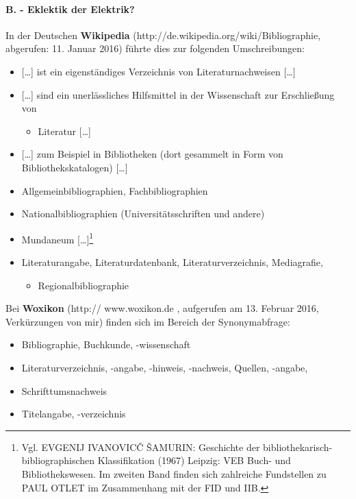 \documentclass[a4paper,
fontsize=11pt,
oneside,
numbers=noperiodatend,
parskip=half-,
bibliography=totoc,
final
]{scrartcl}
\providecommand{\tightlist}{%
  \setlength{\itemsep}{0pt}\setlength{\parskip}{0pt}}
\begin{document}
\paragraph{B. - Eklektik der
Elektrik?}\label{b.---eklektik-der-elektrik}

In der Deutschen \textbf{Wikipedia}
(http://de.wikipedia.org/wiki/Bibliographie, abgerufen: 11. Januar 2016)
führte dies zur folgenden Umschreibungen:

\begin{itemize}
\item
  {[}\ldots{}{]} ist ein eigenständiges Verzeichnis von
  Literaturnachweisen {[}\ldots{}{]}
\item
  {[}\ldots{}{]} sind ein unerlässliches Hilfsmittel in der Wissenschaft
  zur Erschließung von

  \begin{itemize}
  \tightlist
  \item
    Literatur {[}\ldots{}{]}
  \end{itemize}
\item
  {[}\ldots{}{]} zum Beispiel in Bibliotheken (dort gesammelt in Form
  von Bibliothekskatalogen) {[}\ldots{}{]}
\item
  Allgemeinbibliographien, Fachbibliographien
\item
  Nationalbibliographien (Universitätsschriften und andere)
\item
  Mundaneum {[}\ldots{}{]}\footnote{Vgl. EVGENIJ IVANOVICČ ŠAMURIN:
    Geschichte der bibliothekarisch-bibliographischen Klassifikation
    (1967) Leipzig: VEB Buch- und Bibliothekswesen. Im zweiten Band
    finden sich zahlreiche Fundstellen zu PAUL OTLET im Zusammenhang mit
    der FID und IIB.}
\item
  Literaturangabe, Literaturdatenbank, Literaturverzeichnis,
  Mediagrafie,

  \begin{itemize}
  \tightlist
  \item
    Regionalbibliographie
  \end{itemize}
\end{itemize}

Bei \textbf{Woxikon} (http:// www.woxikon.de , aufgerufen am 13. Februar
2016, Verkürzungen von mir) finden sich im Bereich der Synonymabfrage:

\begin{itemize}
\item
  Bibliographie, Buchkunde, -wissenschaft
\item
  Literaturverzeichnis, -angabe, -hinweis, -nachweis, Quellen, -angabe,
\item
  Schrifttumsnachweis
\item
  Titelangabe, -verzeichnis
\end{itemize}
\end{document}
